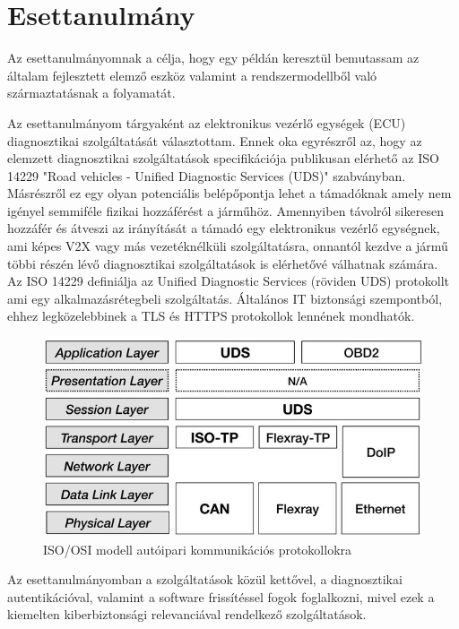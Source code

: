 \chapter{Esettanulmány}

Az esettanulmányomnak a célja, hogy egy példán keresztül bemutassam az általam fejlesztett elemző eszköz valamint a rendszermodellből való származtatásnak a folyamatát.

Az esettanulmányom tárgyaként az elektronikus vezérlő egységek (ECU) diagnosztikai szolgáltatását választottam. Ennek oka egyrészről az, hogy az elemzett diagnosztikai szolgáltatások specifikációja publikusan elérhető az ISO 14229 "Road vehicles - Unified Diagnostic Services (UDS)" \cite{ISO14229} szabványban. Másrészről ez egy olyan potenciális belépőpontja lehet a támadóknak amely nem igényel semmiféle fizikai hozzáférést a járműhöz. Amennyiben távolról sikeresen hozzáfér és átveszi az irányítását a támadó egy elektronikus vezérlő egységnek, ami képes V2X vagy más vezetéknélküli szolgáltatásra, onnantól kezdve a jármű többi részén lévő diagnosztikai szolgáltatások is elérhetővé válhatnak számára.\\

Az ISO 14229\cite{ISO14229} definiálja az Unified Diagnostic Services (röviden UDS) protokollt ami egy alkalmazásrétegbeli szolgáltatás. Általános IT biztonsági szempontból, ehhez legközelebbinek a TLS és HTTPS protokollok lennének mondhatók.

\begin{figure}[!ht]
	\centering
	\includegraphics[width=130mm, keepaspectratio]{figures/06_isoosi.jpg}
	\caption{ISO/OSI modell autóipari kommunikációs protokollokra\cite{ISOOSI}}
\end{figure}

Az esettanulmányomban a szolgáltatások közül kettővel, a diagnosztikai autentikációval, valamint a software frissítéssel fogok foglalkozni, mivel ezek a kiemelten kiberbiztonsági relevanciával rendelkező szolgáltatások.\\

